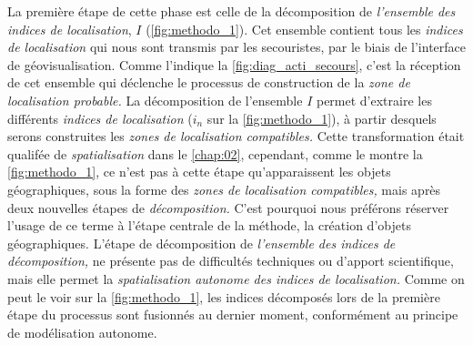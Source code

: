 La première étape de cette phase est celle de la décomposition de
\emph{l'ensemble des indices de localisation}, \(I\)
(\autoref{fig:methodo_1}). Cet ensemble contient tous les
\emph{indices de localisation} qui nous sont transmis par les
secouristes, par le biais de l'interface de géovisualisation. Comme
l'indique la \autoref{fig:diag_acti_secours}, c'est la réception de
cet ensemble qui déclenche le processus de construction de la
\emph{zone de localisation probable.} La décomposition de l'ensemble
\(I\) permet d'extraire les différents \emph{indices de localisation}
(\(i_n\) sur la \autoref{fig:methodo_1}), à partir desquels serons
construites les\emph{ zones de localisation compatibles.} Cette
transformation était qualifée de \emph{spatialisation} dans le
\autoref{chap:02}, cependant, comme le montre la
\autoref{fig:methodo_1}, ce n'est pas à cette étape qu'apparaissent
les objets géographiques, sous la forme des \emph{zones de
  localisation compatibles,} mais après deux nouvelles étapes de
\emph{décomposition.} C'est pourquoi nous préférons réserver l'usage
de ce terme à l'étape centrale de la méthode, la création d'objets
géographiques. L'étape de décomposition de \emph{l'ensemble des
  indices de décomposition,} ne présente pas de difficultés techniques
ou d'apport scientifique, mais elle permet la \emph{spatialisation
  autonome des indices de localisation.} Comme on peut le voir sur la
\autoref{fig:methodo_1}, les indices décomposés lors de la première
étape du processus sont fusionnés au dernier moment, conformément au
principe de modélisation autonome.


